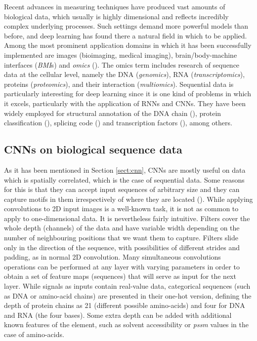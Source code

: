 Recent advances in measuring techniques have produced vast amounts of biological data, which usually is highly dimensional and reflects incredibly complex underlying processes. Such settings demand more powerful models than before, and deep learning has found there a natural field in which to be applied. Among the most prominent application domains in which it has been successfully implemented are images (bioimaging, medical imaging), brain/body-machine interfaces (\textit{BMI}s) and \textit{omics} (\cite{Mahmud2018}). The omics term includes research of sequence data at the cellular level, namely the DNA (\textit{genomics}), RNA (\textit{transcriptomics}), proteins (\textit{proteomics}), and their interaction (\textit{multiomics}). Sequential data is particularly interesting for deep learning since it is one kind of problems in which it excels, particularly with the application of RNNs and CNNs. They have been widely employed for structural annotation of the DNA chain (\cite{Jones2017}), protein classification (\cite{Min2017}), splicing code (\cite{Mamoshina2016}) and transcription factors (\cite{Ching2017}), among others.

\subsection{CNNs on biological sequence data}
As it has been mentioned in Section \ref{sect:cnn}, CNNs are mostly useful on data which is spatially correlated, which is the case of sequential data. Some reasons for this is that they can accept input sequences of arbitrary size and they can capture motifs in them irrespectively of where they are located (\cite{Jurtz2017}). While applying convolutions to 2D input images is a well-known task, it is not as common to apply to one-dimensional data. It is nevertheless fairly intuitive. Filters cover the whole depth (channels) of the data and have variable width depending on the number of neighbouring positions that we want them to capture. Filters slide only in the direction of the sequence, with possibilities of different strides and padding, as in normal 2D convolution. Many simultaneous convolutions operations can be performed at any layer with varying parameters in order to obtain a set of feature maps (sequences) that will serve as input for the next layer. While signals as inputs contain real-value data, categorical sequences (such as DNA or amino-acid chains) are presented in their one-hot version, defining the depth of protein chains as 21 (different possible amino-acids) and four for DNA and RNA (the four bases). Some extra depth can be added with additional known features of the element, such as solvent accessibility or \textit{pssm} values in the case of amino-acids.

